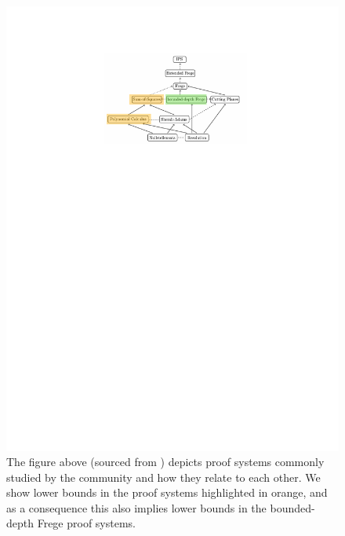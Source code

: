 \documentclass[11pt]{article}
\begin{document}
\begin{figure}
	\includegraphics{assets/proof-system-relationships.pdf}
	\caption{The figure above (sourced from \citep[Page 9]{fleming2019semialgebraic}) depicts proof systems commonly studied by the community and how they relate to each other. We show lower bounds in the proof systems highlighted in orange, and as a consequence this also implies lower bounds in the bounded-depth Frege proof systems.}
	\label{fig:example-proof-systems}
\end{figure}
\end{document}
